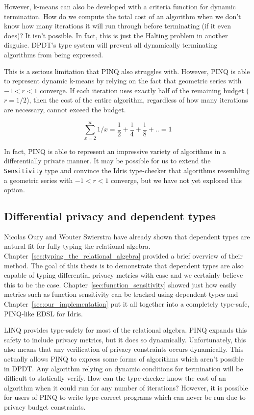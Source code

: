 \documentclass[12pt]{article}
\begin{document}
However, k-means can also be developed with a criteria function for dynamic termination.
How do we compute the total cost of an algorithm when we don't know how many iterations it will run through before terminating (if it even does)?
It isn't possible.
In fact, this is just the Halting problem in another disguise.
DPDT's type system will prevent all dynamically terminating algorithms from being expressed.

This is a serious limitation that PINQ also struggles with.
However, PINQ is able to represent dynamic k-means by relying on the fact that geometric series with $-1 < r < 1$ converge.
If each iteration uses exactly half of the remaining budget ($r=1/2$), then the cost of the entire algorithm, regardless of how many iterations are necessary, cannot exceed the budget.

$$\sum_{x=2}^{\infty} 1/x = \frac{1}{2} + \frac{1}{4} + \frac{1}{8} + .. = 1$$

In fact, PINQ is able to represent an impressive variety of algorithms in a differentially private manner.
It may be possible for us to extend the \texttt{Sensitivity} type and convince the Idris type-checker that algorithms resembling a geometric series with $-1 < r < 1$ converge, but we have not yet explored this option.

\subsection{Differential privacy and dependent types}

Nicolas Oury and Wouter Swierstra have already shown that dependent types are natural fit for fully typing the relational algebra\cite{OurySwierstra08PowerOfPi}.
Chapter~\ref{sec:typing_the_relational_algebra} provided a brief overview of their method.
The goal of this thesis is to demonstrate that dependent types are also capable of typing differential privacy metrics with ease and we certainly believe this to be the case.
Chapter~\ref{sec:function_sensitivity} showed just how easily metrics such as function sensitivity can be tracked using dependent types and Chapter~\ref{sec:our_implementation} put it all together into a completely type-safe, PINQ-like EDSL for Idris.


LINQ provides type-safety for most of the relational algebra.
PINQ expands this safety to include privacy metrics, but it does so dynamically.
Unfortunately, this also means that any verification of privacy constraints occurs dynamically.
This actually allows PINQ to express some forms of algorithms which aren't possible in DPDT.
Any algorithm relying on dynamic conditions for termination will be difficult to statically verify.
How can the type-checker know the cost of an algorithm when it could run for any number of iterations?
However, it is possible for users of PINQ to write type-correct programs which can never be run due to privacy budget constraints.
\end{document}
